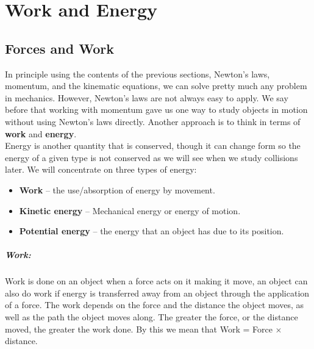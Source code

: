 \chapter{Work and Energy}
\label{sec: work and energy}

\section{Forces and Work}
In principle using the contents of the previous sections, Newton's laws, momentum, and the kinematic equations, we can solve pretty much any problem in mechanics. However, Newton's laws are not always easy to apply. We say before that working with momentum gave us one way to study objects in motion without using Newton's laws directly. Another approach is to think in terms of \textbf{work} and \textbf{energy}.\\

Energy is another quantity that is conserved, though it can change form so the energy of a given type is not conserved as we will see when we study collisions later. We will concentrate on three types of energy:
\begin{itemize}
\setlength{\itemsep}{-5pt}
    \item \textbf{Work} -- the use/absorption of energy by movement.
    \item \textbf{Kinetic energy} -- Mechanical energy or energy of motion.
    \item \textbf{Potential energy} -- the energy that an object has due to its position.
\end{itemize} 

\paragraph{Work:} Work is done on an object when a force acts on it making it move, an object can also do work if energy is transferred away from an object through the application of a force. The work depends on the force and the distance the object moves, as well as the path the object moves along. The greater the force, or the distance moved, the greater the work done. By this we mean that Work = Force $\times$ distance. \\

